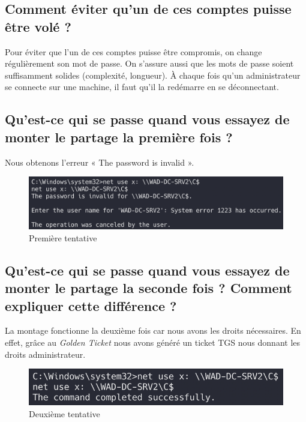 \documentclass{extarticle} %
\begin{document}
    \subsection{Comment éviter qu’un de ces comptes puisse être volé ?}
    Pour éviter que l'un de ces comptes puisse être compromis, on change régulièrement son mot de passe.
    On s'assure aussi que les mots de passe soient suffisamment solides (complexité, longueur).
    À chaque fois qu'un administrateur se connecte sur une machine, il faut qu'il la redémarre en se déconnectant.

    \subsection{Qu’est-ce qui se passe quand vous essayez de monter le partage la première fois ?}
    Nous obtenons l'erreur « The password is invalid ».

    \begin{figure}[H]
        \centering
        \includegraphics[scale=0.3]{images/c_dc_first_try.png}
        \caption{Première tentative}
    \end{figure}

    \subsection{Qu’est-ce qui se passe quand vous essayez de monter le partage la seconde fois ? Comment expliquer cette différence ?}
    La montage fonctionne la deuxième fois car nous avons les droits nécessaires. En effet, grâce au \textit{Golden Ticket} nous avons généré un ticket TGS
    nous donnant les droits administrateur.

    \begin{figure}[H]
        \centering
        \includegraphics[scale=0.3]{images/c_dc_second_try.png}
        \caption{Deuxième tentative}
    \end{figure}
\end{document}
